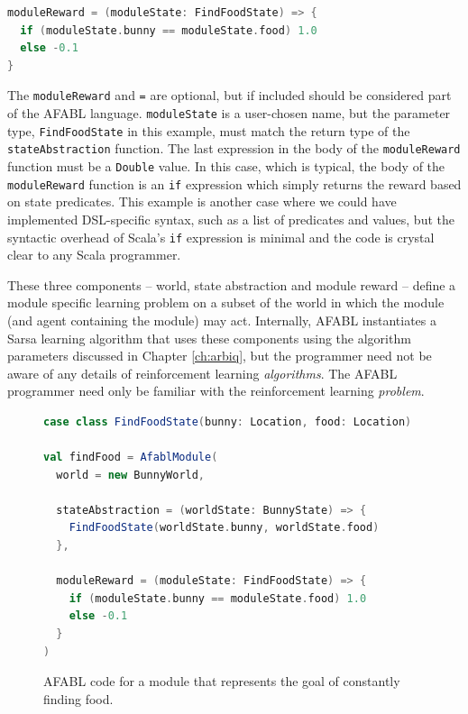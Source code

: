 \begin{center}
\begin{lstlisting}[language=Scala,frame=none]
moduleReward = (moduleState: FindFoodState) => {
  if (moduleState.bunny == moduleState.food) 1.0
  else -0.1
}
\end{lstlisting}
\end{center}

The {\tt moduleReward} and {\tt =} are optional, but if included should be considered part of the AFABL language. {\tt moduleState} is a user-chosen name, but the parameter type, {\tt FindFoodState} in this example, must match the return type of the {\tt stateAbstraction} function. The last expression in the body of the {\tt moduleReward} function must be a {\tt Double} value. In this case, which is typical, the body of the {\tt moduleReward} function is an {\tt if} expression which simply returns the reward based on state predicates. This example is another case where we could have implemented DSL-specific syntax, such as a list of predicates and values, but the syntactic overhead of Scala's {\tt if} expression is minimal and the code is crystal clear to any Scala programmer.

These three components -- world, state abstraction and module reward -- define a module specific learning problem on a subset of the world in which the module (and agent containing the module) may act. Internally, AFABL instantiates a Sarsa learning algorithm that uses these components using the algorithm parameters discussed in Chapter \ref{ch:arbiq}, but the programmer need not be aware of any details of reinforcement learning {\it algorithms}. The AFABL programmer need only be familiar with the reinforcement learning {\it problem}.

\begin{figure}[!h]
\begin{center}

\begin{lstlisting}[language=Scala]
case class FindFoodState(bunny: Location, food: Location)

val findFood = AfablModule(
  world = new BunnyWorld,

  stateAbstraction = (worldState: BunnyState) => {
    FindFoodState(worldState.bunny, worldState.food)
  },

  moduleReward = (moduleState: FindFoodState) => {
    if (moduleState.bunny == moduleState.food) 1.0
    else -0.1
  }
)
\end{lstlisting}

\caption{AFABL code for a module that represents the goal of constantly finding food.}
\end{center}
\label{fig:find-food-code}
\end{figure}

